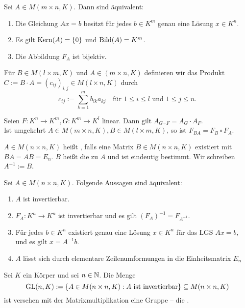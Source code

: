 \begin{korollar}
	\label{folg:I.6.9}
	Sei $A \in M(m\times n,K)$.
	Dann sind äquivalent:
	\begin{enumerate}[(1)]
		\item Die Gleichung $Ax=b$ besitzt für jedes $b \in K^m$ genau eine Lösung $x \in K^n$.
		\item Es gilt $\operatorname{Kern}(A) = \{0\}$ und $\operatorname{Bild}(A) = K^m$.
		\item Die Abbildung $F_A$ ist bijektiv.
	\end{enumerate}
\end{korollar}

\setcounter{definition}{12}
\begin{definition}[Matrixmultiplikation]
	\label{def:I.6.13}
	Für $B \in M(l \times m,K)$ und $A \in (m \times n,K)$ definieren wir das Produkt $C := B \cdot A = (c_{ij})_{i,j} \in M(l \times n,K)$ durch 
	\[
		c_{ij} := \sum_{k=1}^{m} b_{ik}a_{kj} \quad \text{für } 1 \leq i \leq l \text{ und } 1 \leq j \leq n.
	\]
\end{definition}

\begin{satz}
	\label{satz:I.6.14}
	Seien $F \colon K^n \rightarrow K^m, G \colon K^m \rightarrow K^l$ linear.
	Dann gilt $A_{G \circ F} = A_G \cdot A_F$. \\
	Ist umgekehrt $A \in M(m \times n,K), B \in M(l \times m,K)$, so ist $F_{BA} = F_B \circ F_A$.
\end{satz}

\setcounter{definition}{16}
\begin{definition}
	\label{def:I.6.17}
	$A \in M(n \times n,K)$ heißt , falls eine Matrix $B \in M(n\times n,K)$ existiert mit $BA = AB = E_n$.
	$B$ heißt die zu $A$  und ist eindeutig bestimmt.
	Wir schreiben $A^{-1} := B$.
\end{definition}

\setcounter{definition}{18}
\begin{satz}
	\label{satz:I.6.19}
	Sei $A \in M(n \times n,K)$.
	Folgende Aussagen sind äquivalent:
	\begin{enumerate}[(1)]
		\item $A$ ist invertierbar.
		\item $F_A\colon K^n \rightarrow K^n$ ist invertierbar und es gilt $(F_A)^{-1} = F_{A^{-1}}$.
		\item Für jedes $b \in K^n$ existiert genau eine Lösung $x \in K^n$ für das LGS $Ax = b$, und es gilt $x = A^{-1}b$.
		\item $A$ lässt sich durch elementare Zeilenumformungen in die Einheitsmatrix $E_n$
	\end{enumerate}
\end{satz}
\newpage
\setcounter{definition}{21}
\begin{definition}
	\label{def:I.6.22}
	Sei $K$ ein Körper und sei $n \in \mathbb{N}$.
	Die Menge
	\[
		\operatorname{GL}(n,K) := \{A \in M(n\times n,K) : A \text{ ist invertierbar}\} \subseteq M(n\times n,K)
	\]
	ist versehen mit der Matrixmultiplikation eine Gruppe -- die .
\end{definition}